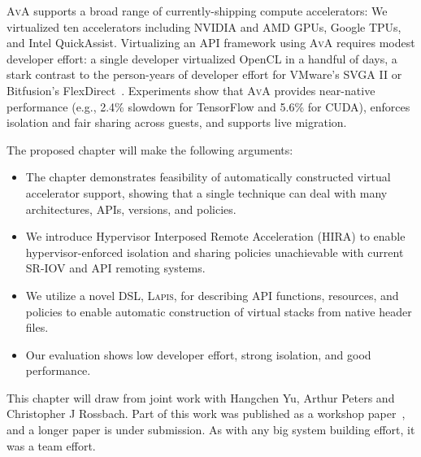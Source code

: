 \textsc{AvA} supports a broad range of currently-shipping compute accelerators:
We virtualized ten accelerators including NVIDIA and AMD GPUs, Google TPUs,
and Intel QuickAssist.
Virtualizing an API framework using \textsc{AvA} requires modest developer
effort:
a single developer virtualized OpenCL in a handful of days,
a stark contrast to the person-years of developer effort for VMware's SVGA II
or Bitfusion's FlexDirect~\cite{bitfusion}.
Experiments show that \textsc{AvA} provides near-native performance (e.g., 2.4\% slowdown for TensorFlow and 5.6\% for CUDA), enforces isolation and fair sharing across guests, and supports live migration.

The proposed chapter will make the following arguments:

\begin{itemize}[nosep,leftmargin=1em,labelwidth=*,align=left]
\item The chapter demonstrates feasibility of automatically constructed virtual accelerator support, showing that a single technique can deal with many architectures, APIs, versions, and policies.
\item We introduce {{H}ypervisor {I}nterposed {R}emote {A}cceleration} (HIRA) to enable hypervisor-enforced isolation and sharing policies unachievable with current SR-IOV and API remoting systems.
\item We utilize a novel DSL, \textsc{Lapis}, for describing API functions, resources, and policies to enable automatic construction of virtual stacks from native header files.
\item Our evaluation shows low developer effort, strong isolation, and good performance.
\end{itemize}

This chapter will draw from joint work with Hangchen Yu, Arthur Peters and Christopher J Rossbach. Part of this work was published as a workshop paper~\cite{ava-hotos}, and a longer paper is under submission. As with any big system building effort, it was a team effort.
